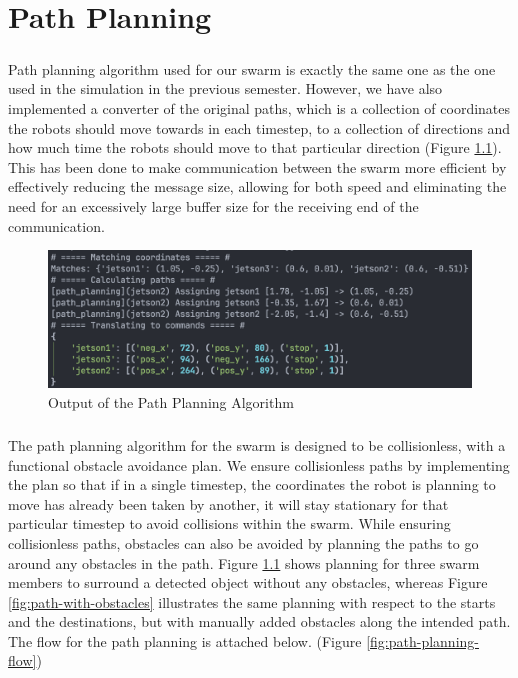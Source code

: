 \chapter{Path Planning}

\paragraph*{}
Path planning algorithm used for our swarm is exactly the same one as the one used in the simulation in the previous semester. However, we have also implemented a converter of the original paths, which is a collection of coordinates the robots should move towards in each timestep, to a collection of directions and how much time the robots should move to that particular direction (Figure \ref{fig:path-without-obstacles}). This has been done to make communication between the swarm more efficient by effectively reducing the message size, allowing for both speed and eliminating the need for an excessively large buffer size for the receiving end of the communication.

\begin{figure} [H]
    \centering
    \includegraphics[width=0.9\linewidth]{assets/images/path_planning/path_without_obstacles.png}
    \caption{Output of the Path Planning Algorithm}
    \label{fig:path-without-obstacles}
\end{figure}

\paragraph*{}
The path planning algorithm for the swarm is designed to be collisionless, with a functional obstacle avoidance plan. We ensure collisionless paths by implementing the plan so that if in a single timestep, the coordinates the robot is planning to move has already been taken by another, it will stay stationary for that particular timestep to avoid collisions within the swarm. While ensuring collisionless paths, obstacles can also be avoided by planning the paths to go around any obstacles in the path. Figure \ref{fig:path-without-obstacles} shows planning for three swarm members to surround a detected object without any obstacles, whereas Figure \ref{fig:path-with-obstacles} illustrates the same planning with respect to the starts and the destinations, but with manually added obstacles along the intended path. The flow for the path planning is attached below. (Figure \ref{fig:path-planning-flow})

